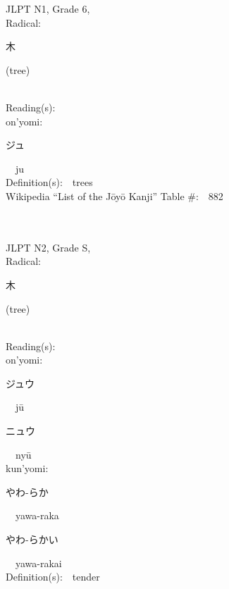 \begin{multicols}{2}
{JLPT N1, Grade 6, \\Radical:\ \ {\begin{CJK}{UTF8}{min} 木 \end{CJK}} (tree) } \\
Reading(s):\ \ \\
{\hspace*{1em}}on'yomi:\ \ \\
{\hspace*{2em}}{\begin{CJK}{UTF8}{min} ジュ \end{CJK}}\ \ ju\ \ \\
Definition(s):\ \ trees \\
Wikipedia ``List of the J\=oy\=o Kanji'' Table \#:\ \ 882 \\
\ \ \\
{\fontsize{34pt}{40pt}  }\ \ \\  %
{JLPT N2, Grade S, \\Radical:\ \ {\begin{CJK}{UTF8}{min} 木 \end{CJK}} (tree) } \\
Reading(s):\ \ \\
{\hspace*{1em}}on'yomi:\ \ \\
{\hspace*{2em}}{\begin{CJK}{UTF8}{min} ジュウ \end{CJK}}\ \ j\=u\ \ \\
{\hspace*{2em}}{\begin{CJK}{UTF8}{min} ニュウ \end{CJK}}\ \ ny\=u\ \ \\
{\hspace*{1em}}kun'yomi:\ \ \\
{\hspace*{2em}}{\begin{CJK}{UTF8}{min} やわ-らか \end{CJK}}\ \ yawa-raka\ \ \\
{\hspace*{2em}}{\begin{CJK}{UTF8}{min} やわ-らかい \end{CJK}}\ \ yawa-rakai\ \ \\
Definition(s):\ \ tender \\

\end{multicols}
